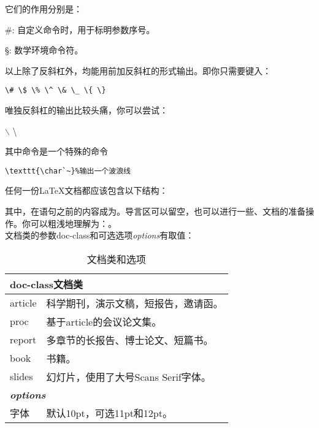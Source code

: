 它们的作用分别是：
\begin{para}
\item[\#{}:]自定义命令时，用于标明参数序号。
\item[\S{}:]数学环境命令符。
\end{para}

以上除了反斜杠外，均能用前加反斜杠的形式输出。即你只需要键入：
\begin{center}
\verb|\# \$ \% \^ \& \_ \{ \}|
\end{center}

唯独反斜杠的输出比较头痛，你可以尝试：
\begin{codeshow}
$\backslash$ \textbackslash
\texttt{}
\end{codeshow}

其中命令是一个特殊的命令
\begin{verbatim}
\texttt{\char`~}%输出一个波浪线
\end{verbatim}

任何一份\LaTeX{}文档都应该包含以下结构：
其中，在语句之前的内容成为。导言区可以留空，也可以进行一些、文档的准备操作。你可以粗浅地理解为：。\\

文档类的参数doc-class和可选选项{\textit{options}}有取值：%
	\begin{table}[!htb]
	\centering
	\caption{文档类和选项}
	\label{tab:documentclass}
	\begin{tabular}{p{5em} @{\ -\ } p{24em}}
		\hline
		\\
		\hline
		article & 科学期刊，演示文稿，短报告，邀请函。\\
		proc	& 基于article的会议论文集。\\
		report	& 多章节的长报告、博士论文、短篇书。\\
		book	& 书籍。\\
		slides	& 幻灯片，使用了大号Scans Serif字体。\\
		\hline
		\\
		\hline
		字体	&默认10pt，可选11pt和12pt。\\
		\hline
	\end{tabular}
\end{table}

